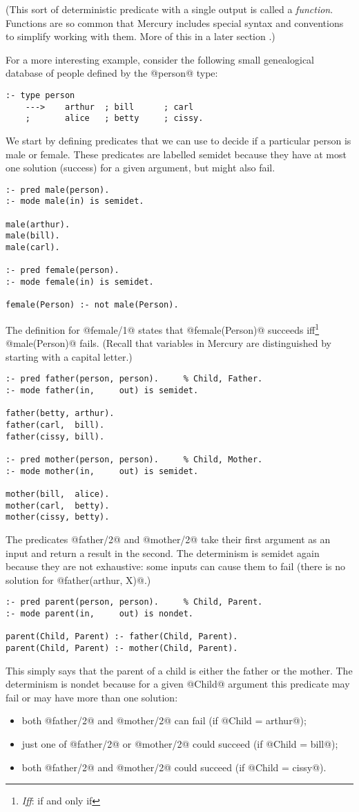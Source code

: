 (This sort of deterministic predicate with a single output is
called a \emph{function}.  Functions are so common that Mercury
includes special syntax and conventions to simplify working
with them.  More of this in a later section \XXX{}.)

For a more interesting example, consider the following small
genealogical database of people defined by the @person@ type:
\begin{verbatim}
:- type person
    --->    arthur  ; bill      ; carl
    ;       alice   ; betty     ; cissy.
\end{verbatim}
We start by defining predicates that we can use to decide if a
particular person is male or female.  These predicates are
labelled semidet because they have at most one solution
(success) for a given argument, but might also fail.
\begin{verbatim}
:- pred male(person).
:- mode male(in) is semidet.

male(arthur).
male(bill).
male(carl).

:- pred female(person).
:- mode female(in) is semidet.

female(Person) :- not male(Person).
\end{verbatim}
The definition for @female/1@ states that @female(Person)@ succeeds
iff\footnote{\emph{Iff}: if and only if} @male(Person)@ fails.  (Recall
that variables in Mercury are distinguished by starting with a capital
letter.)
\begin{verbatim}
:- pred father(person, person).     % Child, Father.
:- mode father(in,     out) is semidet.

father(betty, arthur).
father(carl,  bill).
father(cissy, bill).

:- pred mother(person, person).     % Child, Mother.
:- mode mother(in,     out) is semidet.

mother(bill,  alice).
mother(carl,  betty).
mother(cissy, betty).
\end{verbatim}
The predicates @father/2@ and @mother/2@ take their first argument
as an input and return a result in the second.  The
determinism is semidet again because they are not exhaustive:
some inputs can cause them to fail (\eg there is no solution
for @father(arthur, X)@.)
\begin{verbatim}
:- pred parent(person, person).     % Child, Parent.
:- mode parent(in,     out) is nondet.

parent(Child, Parent) :- father(Child, Parent).
parent(Child, Parent) :- mother(Child, Parent).
\end{verbatim}
This simply says that the parent of a child is either the
father or the mother.  The determinism is nondet because for a
given @Child@ argument this predicate may fail or may have more
than one solution:
\begin{itemize}
\item both @father/2@ and @mother/2@ can fail
(\eg if @Child = arthur@);
\item just one of @father/2@ or @mother/2@ could succeed
(\eg if @Child = bill@);
\item both @father/2@ and @mother/2@ could succeed
(\eg if @Child = cissy@).
\end{itemize}

